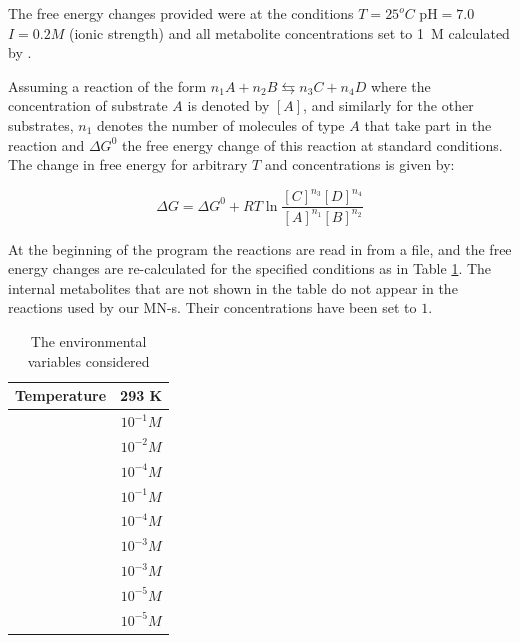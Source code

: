 \documentclass[a4paper,12pt]{article}
\begin{document}
	The free energy changes provided were at the conditions $T=25  ^o C$ pH$=7.0$ $I=0.2 M$ (ionic strength) and all metabolite concentrations set to 1~M calculated by \cite{BartekLower}. 
	
	Assuming a reaction of the form $n_1A + n_2B \leftrightarrows n_3C + n_4D$ where the concentration of substrate $A$ is denoted by $[A]$, and similarly for the other substrates, $n_1$ denotes the number of molecules of type $A$ that take part in the reaction and  $\Delta G^0$  the free energy change of this reaction at standard conditions. The change in free energy for arbitrary $T$ and concentrations is given by: 
	
	\begin{equation}\label{eq:freeechange}
		\Delta G = \Delta G^0 + R T \ln \frac{[C]^{n_3}[D]^{n_4}}{[A]^{n_1}[B]^{n_2}}
	\end{equation}
	
	At the beginning of the program the reactions are read in from a file, and the free energy changes are re-calculated for the specified conditions as in Table \ref{environmentTable}. The internal metabolites that are not shown in the table do not appear in the reactions used by our MN-s. Their concentrations have been set to $1$.  
	
	\begin{table}
		\centering
	\begin{tabular}{|c|c|}
		
		\hline Temperature & 293 K \\ 
		\hline [ATP] & $10^{-1} M$ \\ 
		\hline [ADP] & $10^{-2} M$ \\ 
		\hline [AMP] & $10^{-4} M$ \\ 
		\hline [NAD$^+$] & $10^{-1} M$ \\ 
		\hline [NADH] & $10^{-4} M$ \\ 
		\hline [Pi] &  $10^{-3} M$\\ 
		\hline [PPi] & $10^{-3} M$ \\ 
		\hline [CO$_2$] & $10^{-5} M$ \\ 
		\hline [NH$_3$] & $10^{-5} M$ \\ 

		\hline 
	\end{tabular} 
	\caption{The environmental variables considered}
	\label{environmentTable}
	\end{table}
\end{document}
